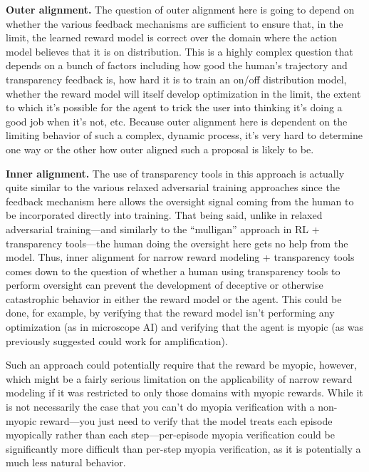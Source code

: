 \documentclass[
  onecolumn,
  natbib,
]{miri-tech-article}
\begin{document}
\textbf{Outer alignment.} The question of outer alignment here is going to depend on whether the various feedback mechanisms are sufficient to ensure that, in the limit, the learned reward model is correct over the domain where the action model believes that it is on distribution. This is a highly complex question that depends on a bunch of factors including how good the human's trajectory and transparency feedback is, how hard it is to train an on/off distribution model, whether the reward model will itself develop optimization in the limit, the extent to which it's possible for the agent to trick the user into thinking it's doing a good job when it's not, etc. Because outer alignment here is dependent on the limiting behavior of such a complex, dynamic process, it's very hard to determine one way or the other how outer aligned such a proposal is likely to be.

\textbf{Inner alignment.} The use of transparency tools in this approach is actually quite similar to the various relaxed adversarial training approaches since the feedback mechanism here allows the oversight signal coming from the human to be incorporated directly into training. That being said, unlike in relaxed adversarial training---and similarly to the ``mulligan'' approach in RL + transparency tools---the human doing the oversight here gets no help from the model. Thus, inner alignment for narrow reward modeling + transparency tools comes down to the question of whether a human using transparency tools to perform oversight can prevent the development of deceptive\cite{TODO: cite https://www.alignmentforum.org/posts/zthDPAjh9w6Ytbeks/deceptive-alignment} or otherwise catastrophic\cite{TODO: cite https://ai-alignment.com/learning-with-catastrophes-59387b55cc30} behavior in either the reward model or the agent. This could be done, for example, by verifying that the reward model isn't performing any optimization (as in microscope AI) and verifying that the agent is myopic\cite{TODO: cite https://www.alignmentforum.org/posts/BKM8uQS6QdJPZLqCr/towards-a-mechanistic-understanding-of-corrigibility} (as was previously suggested could work for amplification).

Such an approach could potentially require that the reward be myopic, however, which might be a fairly serious limitation on the applicability of narrow reward modeling if it was restricted to only those domains with myopic rewards. While it is not necessarily the case that you can't do myopia verification with a non-myopic reward---you just need to verify that the model treats each episode myopically rather than each step---per-episode myopia verification could be significantly more difficult than per-step myopia verification, as it is potentially a much less natural behavior.
\end{document}
